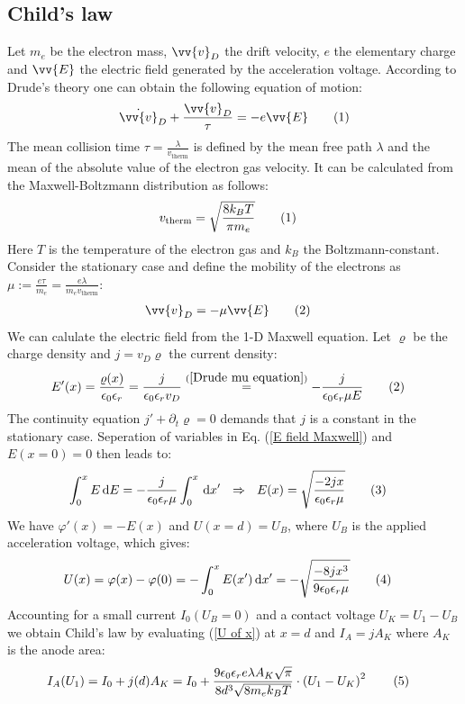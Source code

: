 \documentclass[a4paper,12pt]{article}
\newcommand\numberthis{\addtocounter{equation}{1}\tag{\theequation}}
\newcommand{\intx}{}
\newcommand{\kla}{}
\newcommand{\tecxt}{}
\begin{document}
\subsection{Child's law}
Let $m_e$ be the electron mass, $\vv{v}_D$ the drift velocity, $e$ the elementary charge and $\vv{E}$ the electric field generated by the acceleration voltage. According to Drude's theory one can obtain the following equation of motion:
\begin{align*}
\dot{\vv{v}}_D + \frac{\vv{v}_D}{\tau}=-e\vv{E}\numberthis\label{Drude equation}
\end{align*} 
The mean collision time $\tau=\frac{\lambda}{v_\tecxt\text{therm}}$ is defined by the mean free path $\lambda$ and the mean of the absolute value of the electron gas velocity. It can be calculated from the Maxwell-Boltzmann distribution as follows:
\begin{align*}
v_\tecxt\text{therm}&=\sqrt{\frac{8k_BT}{\pi m_e}}\numberthis\label{v therm}
\end{align*}
Here $T$ is the temperature of the electron gas and $k_B$ the Boltzmann-constant. Consider the stationary case and define the mobility of the electrons as $\mu:=\frac{e\tau}{m_e}=\frac{e\lambda}{m_e v_\tecxt\text{therm}}$:
\begin{align*}
\vv{v}_D&=-\mu\vv{E}\numberthis\label{Drude mu equation}
\end{align*}
We can calulate the electric field from the 1-D Maxwell equation. Let $\varrho$ be the charge density and $j=v_D\varrho$ the current density:
\begin{align*}
E'(x)&=\frac{\varrho(x)}{\epsilon_0\epsilon_r}=\frac{j}{\epsilon_0\epsilon_r v_D}\overset{(\ref{Drude mu equation})}{=}-\frac{j}{\epsilon_0\epsilon_r\mu E}\numberthis\label{E field Maxwell}
\end{align*}
The continuity equation $j'+\partial_t\varrho=0$ demands that $j$ is a constant in the stationary case. Seperation of variables in Eq. (\ref{E field Maxwell}) and $E(x=0)=0$ then leads to:
\begin{align*}
\intx\int_{0}^{x}E\,\mathrm{d}E&=-\frac{j}{\epsilon_0\epsilon_r\mu}\intx\int_{0}^{x}\,\mathrm{d}x'\ \ \Rightarrow\ \ E(x)=\sqrt{\frac{-2jx}{\epsilon_0\epsilon_r\mu}}\numberthis\label{E field}
\end{align*}
We have $\varphi'(x)=-E(x)$ and $U(x=d)=U_B$, where $U_B$ is the applied acceleration voltage, which gives:
\begin{align*}
U(x)&=\varphi(x)-\varphi(0)=-\intx\int_{0}^{x}E(x')\,\mathrm{d}x'=-\sqrt{\frac{-8jx^3}{9\epsilon_0\epsilon_r\mu}}\numberthis\label{U of x}
\end{align*}
Accounting for a small current $I_0(U_B=0)$ and a contact voltage $U_K=U_1-U_B$ we obtain Child's law by evaluating (\ref{U of x}) at $x=d$ and $I_A=j A_K$ where $A_K$ is the anode area:
\begin{align*}
I_A(U_1)&=I_0+j(d)A_K=I_0+\frac{9\epsilon_0\epsilon_r e\lambda A_K\sqrt{\pi}}{8d^3\sqrt{8m_ek_BT}}\cdot\kla\left( {U_1-U_K} \right)^2\numberthis\label{Child law}
\end{align*}
\end{document}
